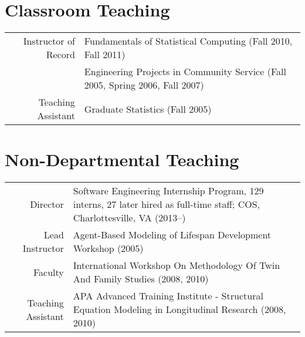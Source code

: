 \documentclass[11pt]{article}
\begin{document}
\section*{Classroom Teaching}
\begin{tabularx}{\textwidth}{rX}
	Instructor of Record  & \textbullet \hspace{.25em} Fundamentals of Statistical Computing (Fall 2010, Fall 2011)\\
                            		& \textbullet \hspace{.25em} Engineering Projects in Community Service (Fall 2005, Spring 2006, Fall 2007)\\
	Teaching Assistant    & \textbullet \hspace{.25em} Graduate Statistics (Fall 2005)\\
\end{tabularx}

\section*{Non-Departmental Teaching}
\begin{tabularx}{\textwidth}{rX}
	Director			& \textbullet \hspace{.25em} Software Engineering Internship Program, 129 interns, 27 later hired as full-time staff; COS, Charlottesville, VA (2013--)\\
	Lead Instructor		& \textbullet \hspace{.25em} Agent-Based Modeling of Lifespan Development Workshop (2005)\\
	Faculty			& \textbullet \hspace{.25em} International Workshop On Methodology Of Twin And Family Studies (2008, 2010)\\
	Teaching Assistant	& \textbullet \hspace{.25em} APA Advanced Training Institute - Structural Equation Modeling in Longitudinal Research (2008, 2010)\\
\end{tabularx}
\end{document}
